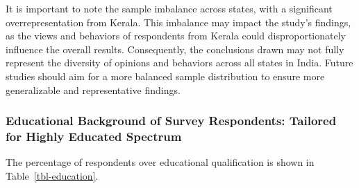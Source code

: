 \documentclass[
  letterpaper,
  DIV=11,
  numbers=noendperiod]{scrartcl}
\begin{document}
It is important to note the sample imbalance across states, with a
significant overrepresentation from Kerala. This imbalance may impact
the study's findings, as the views and behaviors of respondents from
Kerala could disproportionately influence the overall results.
Consequently, the conclusions drawn may not fully represent the
diversity of opinions and behaviors across all states in India. Future
studies should aim for a more balanced sample distribution to ensure
more generalizable and representative findings.

\subsubsection{Educational Background of Survey Respondents: Tailored
for Highly Educated
Spectrum}\label{educational-background-of-survey-respondents-tailored-for-highly-educated-spectrum}

The percentage of respondents over educational qualification is shown in
Table~\ref{tbl-education}.
\end{document}
